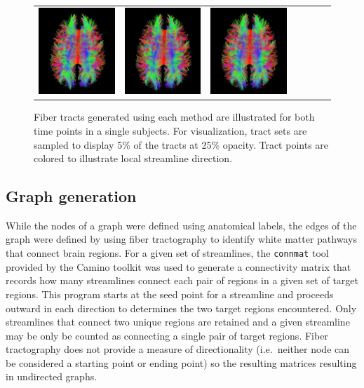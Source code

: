 \documentclass{frontiersSCNS} %
\begin{document}
\begin{figure}
\begin{center}
\begin{tabular}{ccccccc}
\includegraphics[width=0.25\linewidth]{figures/113_33_euler.png} & 
\includegraphics[width=0.25\linewidth]{figures/113_33_rk4.png} & 
\includegraphics[width=0.25\linewidth]{figures/113_33_tend.png} \\
\end{tabular}
\caption{Fiber tracts generated using each method are illustrated for both time points in a single subjects. For visualization, tract sets are sampled to display 5\% of the tracts at 25\% opacity. Tract points are colored to illustrate local streamline direction.}
\label{fig:tracts}
\end{center}
\end{figure}


\subsection{Graph generation}
While the nodes of a graph were defined using anatomical labels, the edges of the graph were defined by using
fiber tractography to identify white matter pathways that connect brain regions. 
For a given set of streamlines, the \texttt{connmat} tool provided by  the Camino toolkit was used to generate
a connectivity matrix that records how many streamlines connect each pair of
regions in a given set of target regions. This program starts at the seed point for a streamline and proceeds outward in each
direction to determines the two target regions encountered. Only streamlines that connect two unique regions are retained and
a given streamline may be only be counted as connecting a single pair of target regions. Fiber tractography does not provide a measure
of directionality (i.e.\ neither node can be considered a starting point or ending point) so the resulting matrices resulting in undirected graphs.
\end{document}
